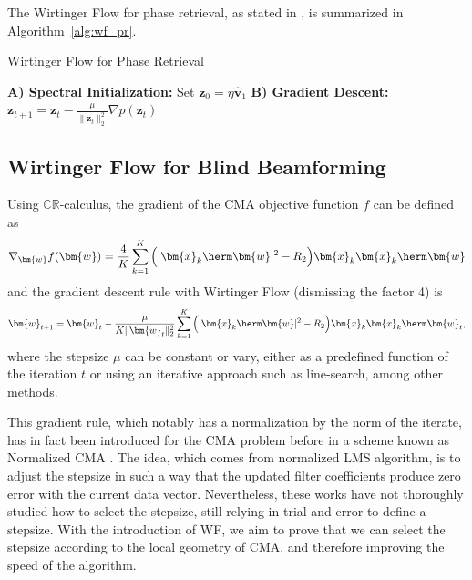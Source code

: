 The Wirtinger Flow for phase retrieval, as stated in \cite{Candes2015a_phaseretrievalWF}, is summarized in Algorithm~\ref{alg:wf_pr}.
\begin{algorithm}[H]
	\caption{Wirtinger Flow for Phase Retrieval}
	\label{alg:wf_pr}
	\begin{algorithmic}[1]
		\Statex \textbf{A) Spectral Initialization:}
		\State Set $\bm{z}_0=\eta\hat{\bm{v}}_1$ 
		\Statex \textbf{B) Gradient Descent:}
		\State $\displaystyle \bm{z}_{t+1}=\bm{z}_t-\frac{\mu}{\|\bm{z}_t\|_2^2}\nabla p(\bm{z}_t)$
		\EndFor
	\end{algorithmic}
\end{algorithm}

\subsection{Wirtinger Flow for Blind Beamforming}
Using $\mathbb{CR}$-calculus, the gradient of the CMA objective function $f$ can be defined as
\begin{equation}
\nabla_{\bm{w}}f(\bm{w})=\frac{4}{K}\sum_{k=1}^K\Big(|\bm{x}_k\herm\bm{w}|^2-R_2\Big)\bm{x}_k\bm{x}_k\herm\bm{w} \label{eqn:wfgradient}
\end{equation}
and the gradient descent rule with Wirtinger Flow (dismissing the factor 4) is 
\begin{equation}
\bm{w}_{t+1}=\bm{w}_t-\frac{\mu}{K\|\bm{w}_t\|_2^2}\sum_{k=1}^K\Big(|\bm{x}_k\herm\bm{w}|^2-R_2\Big)\bm{x}_k\bm{x}_k\herm\bm{w}_t, \label{eqn:wfupdaterule}
\end{equation}
where the stepsize $\mu$ can be constant or vary, either as a predefined function of the iteration $t$ \cite{Candes2015a_phaseretrievalWF} or using an iterative approach such as line-search, among other methods.

This gradient rule, which notably has a normalization by the norm of the iterate, has in fact been introduced for the CMA problem before in a scheme known as Normalized CMA \cite{Jones1995ncma,Tanrikulu1997ncma,Dogancay2001ncmapartialupdates}. The idea, which comes from normalized LMS algorithm, is to adjust the stepsize in such a way that the updated filter coefficients produce zero error with the current data vector. Nevertheless, these works have not thoroughly studied how to select the stepsize, still relying in trial-and-error to define a stepsize. With the introduction of WF, we aim to prove that we can select the stepsize according to the local geometry of CMA, and therefore improving the speed of the algorithm.

